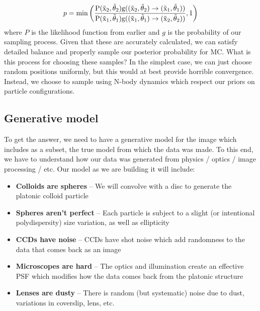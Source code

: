 \documentclass[preprint,amsmath,amssymb]{revtex4}
\begin{document}
\begin{equation}
    p = \rm{min}\left(\frac{P(\vec{x}_2, \vec{\theta}_2) g((\vec{x}_2,\vec{\theta}_2) \rightarrow (\vec{x}_1, \vec{\theta}_1))}{P(\vec{x}_1, \vec{\theta}_1) g((\vec{x}_1,\vec{\theta}_1) \rightarrow (\vec{x}_2, \vec{\theta}_2))}, 1\right)
\end{equation}
where $P$ is the likelihood function from earlier and $g$ is the probability of
our sampling process.  Given that these are accurately calculated, we can
satisfy detailed balance and properly sample our posterior probability for MC.
What is this process for choosing these samples?  In the simplest case, we can
just choose random positions uniformly, but this would at best provide horrible
convergence.  Instead, we choose to sample using N-body dynamics which respect
our priors on particle configurations.

\subsection{Generative model}

To get the answer, we need to have a generative model for the image which
includes as a subset, the true model from which the data was made.  To this
end, we have to understand how our data was generated from physics / optics /
image processing / etc.  Our model as we are building it will include:

\begin{itemize}

    \item {\bf Colloids are spheres} -- We will convolve with a disc to
        generate the platonic colloid particle

    \item {\bf Spheres aren't perfect} -- Each particle is subject to a slight
        (or intentional polydispersity) size variation, as well as ellipticity

    \item {\bf CCDs have noise} -- CCDs have shot noise which add randomness to
        the data that comes back as an image

    \item {\bf Microscopes are hard} -- The optics and illumination create an
        effective PSF which modifies how the data comes back from the platonic
        structure

    \item {\bf Lenses are dusty} -- There is random (but systematic) noise due
        to dust, variations in coverslip, lens, etc.

\end{itemize}
\end{document}
